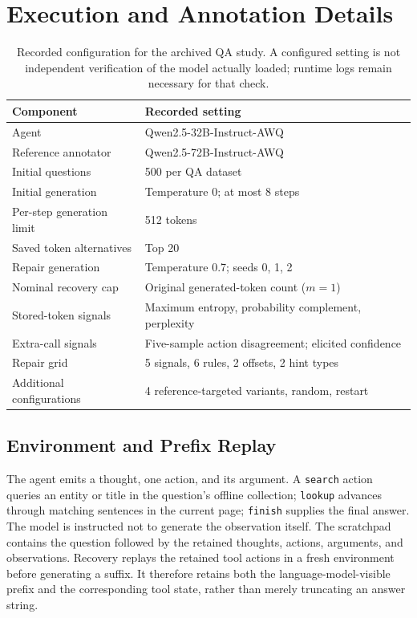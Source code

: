 \documentclass{article}
\begin{document}
\section{Execution and Annotation Details}
\label{app:implementation}
\begin{table}[h]
\centering
\caption{Recorded configuration for the archived QA study. A configured
setting is not independent verification of the model actually loaded;
runtime logs remain necessary for that check.}
\label{tab:configuration}
\small
\begin{tabular}{@{}ll@{}}
\toprule
Component & Recorded setting \\
\midrule
Agent & Qwen2.5-32B-Instruct-AWQ \\
Reference annotator & Qwen2.5-72B-Instruct-AWQ \\
Initial questions & 500 per QA dataset \\
Initial generation & Temperature 0; at most 8 steps \\
Per-step generation limit & 512 tokens \\
Saved token alternatives & Top 20 \\
Repair generation & Temperature 0.7; seeds 0, 1, 2 \\
Nominal recovery cap & Original generated-token count ($m=1$) \\
Stored-token signals & Maximum entropy, probability complement, perplexity \\
Extra-call signals & Five-sample action disagreement; elicited confidence \\
Repair grid & 5 signals, 6 rules, 2 offsets, 2 hint types \\
Additional configurations & 4 reference-targeted variants, random, restart \\
\bottomrule
\end{tabular}
\end{table}

\subsection{Environment and Prefix Replay}
The agent emits a thought, one action, and its argument. A
\texttt{search} action queries an entity or title in the question's offline
collection; \texttt{lookup} advances through matching sentences in the
current page; \texttt{finish} supplies the final answer. The model is
instructed not to generate the observation itself. The scratchpad contains
the question followed by the retained thoughts, actions, arguments, and
observations. Recovery replays the retained tool actions in a fresh
environment before generating a suffix. It therefore retains both the
language-model-visible prefix and the corresponding tool state, rather
than merely truncating an answer string.
\end{document}
